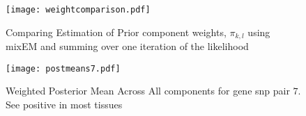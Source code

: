 \documentclass[10pt]{article}
\begin{document}
\begin{figure}[htbp]
\texttt{[image: weightcomparison.pdf]}
\caption{Comparing Estimation of Prior component weights, $\pi_{k,l}$ using mixEM and summing over one iteration of the likelihood}
\end{figure}




\begin{figure}[htbp]
\texttt{[image: postmeans7.pdf]}
\caption{Weighted Posterior Mean Across All components for gene snp pair $7$. See positive in most tissues}
\end{figure}
\end{document}
